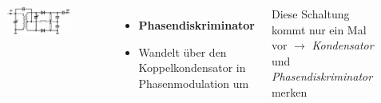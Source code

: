 \begin{frame}
  \begin{columns}
    \begin{figure}
      \includegraphics[width=\textwidth,height=.85\textheight,keepaspectratio]{a12/td507.png}
    \end{figure}
    \begin{itemize}
      \item \textbf{Phasendiskriminator}
      \item Wandelt über den Koppelkondensator in Phasenmodulation um
    \end{itemize}
    {\small Diese Schaltung kommt nur ein Mal vor $\rightarrow$ \emph{Kondensator} und \emph{Phasendiskriminator} merken}
  \end{columns}
\end{frame}

